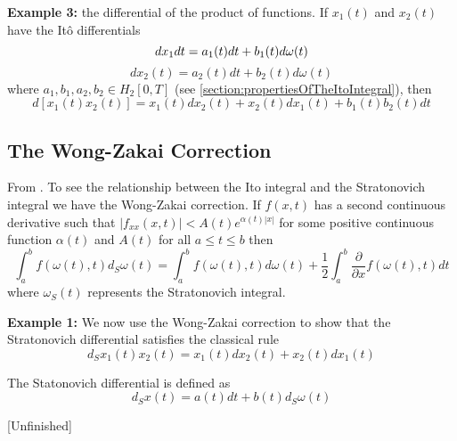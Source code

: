 \documentclass[12pt]{book}
\begin{document}
\textbf{Example 3:} the differential of the product of functions. If $x_1(t)$ and $x_2(t)$ have the It\^{o} differentials
\begin{equation*}
dx_1dt = a_1(t)dt +b_1(t)d\omega(t)\\
\end{equation*}
\begin{equation*}
dx_2(t) =a_2(t)dt+b_2(t)d\omega(t) 
\end{equation*}
where $a_1,b_1,a_2,b_2\in H_2[0,T]$ (see \ref{section:propertiesOfTheItoIntegral}), then
\begin{equation*}
d[x_1(t)x_2(t)]= x_1(t)dx_2(t)+x_2(t)dx_1(t)+b_1(t)b_2(t)dt
\end{equation*}

\subsection{The Wong-Zakai Correction}\label{section:theWongZakaiCorrection}
From \cite{schuss2009theory}. To see the relationship between the Ito integral and the Stratonovich integral we have the Wong-Zakai correction.  If $f(x,t)$ has a second continuous derivative such that $|f_{xx}(x,t)|<A(t)e^{\alpha(t)|x|} $ for some positive continuous function $\alpha(t)$ and $A(t)$ for all $a\leq t \leq b$ then
\begin{equation}
\int_{a}^b f(\omega(t),t)d_S\omega(t) = \int_a^b f(\omega(t),t)d\omega(t)+\frac{1}{2}\int_a^b\frac{\partial}{\partial x}f(\omega(t),t)dt
\end{equation}
where $\omega_S(t)$ represents the Stratonovich integral.

\textbf{Example 1:} We now use the Wong-Zakai correction to show that the Stratonovich differential satisfies the classical rule
\begin{equation*}
d_Sx_1(t)x_2(t)= x_1(t)dx_2(t) +x_2(t)dx_1(t)
\end{equation*}

The Statonovich differential is defined as 
\begin{equation*}
d_Sx(t) = a(t)dt+b(t)d_S\omega(t)
\end{equation*}

[Unfinished]
\end{document}
